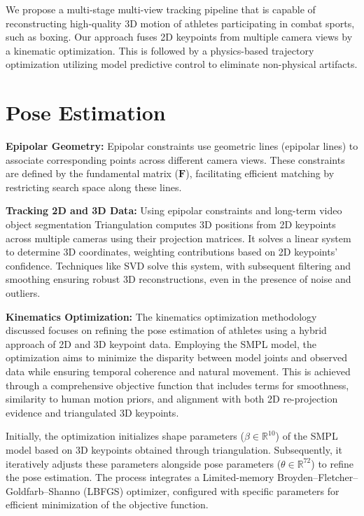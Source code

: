 We propose a multi-stage multi-view tracking pipeline that is capable of reconstructing high-quality 3D motion of athletes participating in combat sports, such as boxing. Our approach fuses 2D keypoints from multiple camera views by a kinematic optimization.  This is followed by a physics-based trajectory optimization utilizing model predictive control to eliminate non-physical artifacts. 

\section{Pose Estimation}
\textbf{Epipolar Geometry:} Epipolar constraints use geometric lines (epipolar lines) to associate corresponding points across different camera views. These constraints are defined by the fundamental matrix ($\mathbf{F}$), facilitating efficient matching by restricting search space along these lines.

\textbf{Tracking 2D and 3D Data:} Using epipolar constraints and long-term video object segmentation Triangulation computes 3D positions from 2D keypoints across multiple cameras using their projection matrices. It solves a linear system to determine 3D coordinates, weighting contributions based on 2D keypoints’ confidence. Techniques like SVD solve this system, with subsequent filtering and smoothing ensuring robust 3D reconstructions, even in the presence of noise and outliers.

\textbf{Kinematics Optimization:} The kinematics optimization methodology discussed focuses on refining the pose estimation of athletes using a hybrid approach of 2D and 3D keypoint data. Employing the SMPL model, the optimization aims to minimize the disparity between model joints and observed data while ensuring temporal coherence and natural movement. This is achieved through a comprehensive objective function that includes terms for smoothness, similarity to human motion priors, and alignment with both 2D re-projection evidence and triangulated 3D keypoints.

Initially, the optimization initializes shape parameters ($\beta \in \mathbb{R}^{10}$) of the SMPL model based on 3D keypoints obtained through triangulation. Subsequently, it iteratively adjusts these parameters alongside pose parameters ($\theta \in \mathbb{R}^{72}$) to refine the pose estimation. The process integrates a Limited-memory Broyden–Fletcher–Goldfarb–Shanno (LBFGS) optimizer, configured with specific parameters for efficient minimization of the objective function.

